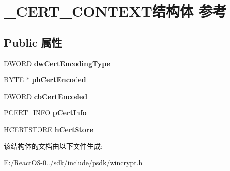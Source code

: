 \hypertarget{struct___c_e_r_t___c_o_n_t_e_x_t}{}\section{\+\_\+\+C\+E\+R\+T\+\_\+\+C\+O\+N\+T\+E\+X\+T结构体 参考}
\label{struct___c_e_r_t___c_o_n_t_e_x_t}
\subsection*{Public 属性}
\begin{DoxyCompactItemize}
\item 
\mbox{\label{struct___c_e_r_t___c_o_n_t_e_x_t_a92cc39a1fbb79aa787c29c00560a9ae3}} 
D\+W\+O\+RD {\bfseries dw\+Cert\+Encoding\+Type}
\item 
\mbox{\label{struct___c_e_r_t___c_o_n_t_e_x_t_afa9b6ffb052e5a4c0777f3884062f05c}} 
B\+Y\+TE $\ast$ {\bfseries pb\+Cert\+Encoded}
\item 
\mbox{\label{struct___c_e_r_t___c_o_n_t_e_x_t_afd5486f8969006c2d14dcd842de08cd6}} 
D\+W\+O\+RD {\bfseries cb\+Cert\+Encoded}
\item 
\mbox{\label{struct___c_e_r_t___c_o_n_t_e_x_t_add1bf978f2bad1e153b19f2cf1beb022}} 
\hyperlink{struct___c_e_r_t___i_n_f_o}{P\+C\+E\+R\+T\+\_\+\+I\+N\+FO} {\bfseries p\+Cert\+Info}
\item 
\mbox{\label{struct___c_e_r_t___c_o_n_t_e_x_t_aa8f312efee4faf57d7f0b910d70fbce7}} 
\hyperlink{interfacevoid}{H\+C\+E\+R\+T\+S\+T\+O\+RE} {\bfseries h\+Cert\+Store}
\end{DoxyCompactItemize}


该结构体的文档由以下文件生成\+:\begin{DoxyCompactItemize}
\item 
E\+:/\+React\+O\+S-\/0../sdk/include/psdk/wincrypt.\+h\end{DoxyCompactItemize}

